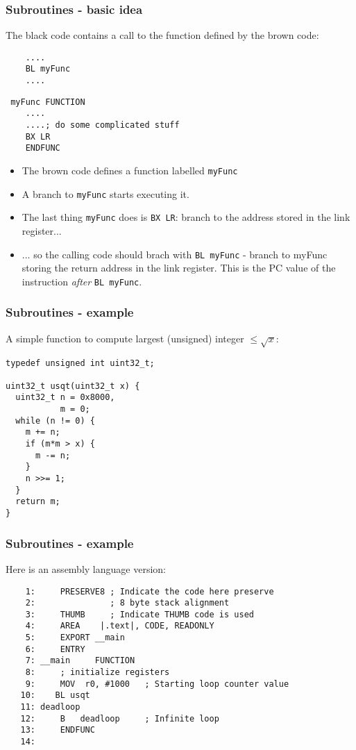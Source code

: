 \documentclass[10pt]{beamer}
\begin{document}
\begin{frame} [fragile]
\frametitle{Subroutines - basic idea}
The black code contains a call to the function defined by the brown code:
\begin{verbatim}
    ....
    BL myFunc
    ....
\end{verbatim}
{\color{brown}
\begin{verbatim}
 myFunc FUNCTION
    ....
    ....; do some complicated stuff
    BX LR
    ENDFUNC
\end{verbatim}
}
\begin{itemize}
\item The {\color{brown}brown} code defines a function labelled \texttt{myFunc}
\item A branch to \texttt{myFunc} starts executing it.
\item The last thing \texttt{myFunc} does is \texttt{BX LR}: branch to the address stored in the link register...
\item ... so the calling code should brach with \texttt{BL myFunc} - branch to myFunc storing the return address in the link register. This is the PC value of the instruction \emph{after} \texttt{BL myFunc}.
\end{itemize}
\end{frame}

\begin{frame} [fragile]
\frametitle{Subroutines - example}
A simple function to compute largest (unsigned) integer $\le \sqrt x$: 
\color{brown}
\begin{verbatim}
typedef unsigned int uint32_t;

uint32_t usqt(uint32_t x) {
  uint32_t n = 0x8000,
           m = 0;
  while (n != 0) {
    m += n;
    if (m*m > x) {
      m -= n;
    }
    n >>= 1;
  }
  return m;
}
\end{verbatim}
\end{frame}

\begin{frame} [fragile]
\frametitle{Subroutines - example}
Here is an assembly language version: 
\begin{verbatim}
    1:     PRESERVE8 ; Indicate the code here preserve 
    2:               ; 8 byte stack alignment
    3:     THUMB     ; Indicate THUMB code is used
    4:     AREA    |.text|, CODE, READONLY  
    5:     EXPORT __main
    6:     ENTRY
    7: __main     FUNCTION
    8:     ; initialize registers
    9:     MOV  r0, #1000  	; Starting loop counter value
   10: 	  BL usqt
   11: deadloop
   12:     B   deadloop  	; Infinite loop
   13:     ENDFUNC
   14:
\end{verbatim}
\end{frame}
\end{document}
